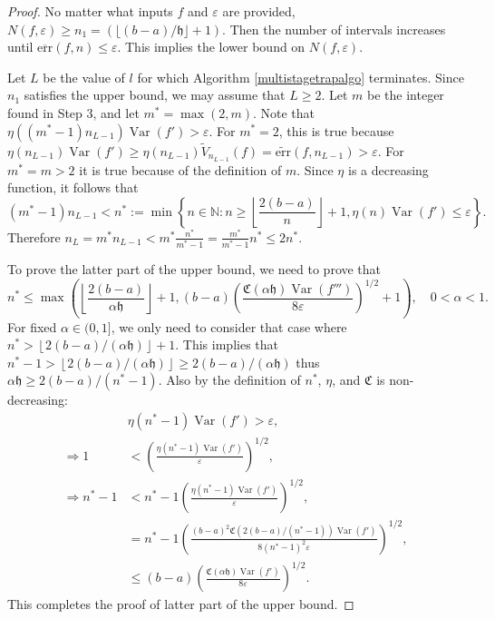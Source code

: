 \documentclass[draft]{iitthesis}
\DeclareMathOperator{\Var}{Var}
\theoremstyle{definition}
\theoremstyle{remark}
\begin{document}
\begin{proof}
  No matter what inputs $f$ and $\varepsilon$ are provided, $N(f,\varepsilon)\ge n_1=(\lfloor (b-a)/\mathfrak{h}\rfloor+1)$. Then the number of intervals increases until $\overline{\text{err}}(f,n)\le\varepsilon$. This implies the lower bound on $N(f,\varepsilon)$.

  Let $L$ be the value of $l$ for which Algorithm \ref{multistagetrapalgo} terminates. Since $n_1$ satisfies the upper bound, we may assume that $L \ge 2$. Let $m$ be the integer found in Step 3, and let $m^*=\max(2,m)$. Note that $\eta((m^*-1)n_{L-1})\Var(f')>\varepsilon$. For $m^*=2$, this is true because $\eta(n_{L-1})\Var(f')\ge\eta(n_{L-1})\widetilde{V}_{n_{L-1}}(f)=\widetilde{\text{err}}(f,n_{L-1})>\varepsilon$. For $m^*=m>2$ it is true because of the definition of $m$. Since $\eta$ is a decreasing function, it follows that
  $$(m^*-1)n_{L-1}<n^*:=\min\left\{n\in\mathbb{N}:n\ge\left\lfloor\frac{2(b-a)}{n}\right\rfloor+1,\eta(n)\Var(f')\le\varepsilon\right\}.$$
  Therefore $n_L=m^*n_{L-1}<m^*\frac{n^*}{m^*-1}=\frac{m^*}{m^*-1}n^*\le2n^*$.

  To prove the latter part of the upper bound, we need to prove that
  $$n^*\leq\max\left(\left\lfloor\frac{2(b-a)}{\alpha\mathfrak{h}}\right\rfloor+1,(b-a)\left(\frac{\mathfrak{C}(\alpha\mathfrak{h})\Var(f''')}{8\varepsilon}\right)^{1/2}+1\right),\quad 0<\alpha<1.$$
  For fixed $\alpha\in(0,1]$, we only need to consider that case where $n^*>\left\lfloor2(b-a)/(\alpha\mathfrak{h})\right\rfloor+1$. This implies that $n^*-1>\left\lfloor2(b-a)/(\alpha\mathfrak{h})\right\rfloor\ge 2(b-a)/(\alpha\mathfrak{h})$ thus $\alpha\mathfrak{h}\ge2(b-a)/(n^*-1)$. Also by the definition of $n^*$, $\eta$, and $\mathfrak{C}$ is non-decreasing:
  \begin{align*}
    &\eta(n^*-1)\Var(f')>\varepsilon, \\
    \Rightarrow 1&<\left(\frac{\eta(n^*-1)\Var(f')}{\varepsilon}\right)^{1/2},\\
    \Rightarrow n^*-1&<n^*-1\left(\frac{\eta(n^*-1)\Var(f')}{\varepsilon}\right)^{1/2},\\
    &=n^*-1\left(\frac{(b-a)^2\mathfrak{C}(2(b-a)/(n^*-1))\Var(f')}{8(n^*-1)^2\varepsilon}\right)^{1/2},\\
    &\le(b-a)\left(\frac{\mathfrak{C}(\alpha\mathfrak{h})\Var(f')}{8\varepsilon}\right)^{1/2}.
  \end{align*}
  This completes the proof of latter part of the upper bound.
\end{proof}
\end{document}
